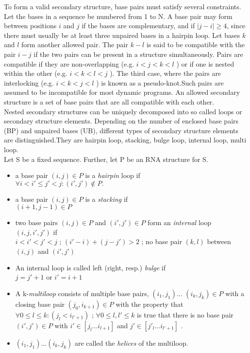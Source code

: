 \documentclass[twoside,a4paper]{report}
\begin{document}
	To form a valid secondary structure, base pairs must satisfy several constraints. Let the bases in a sequence be numbered from 1 to N. A base pair may form between positions $i$ and $j$ if the bases are complementary, and if $|j - i | \geq 4$, since there must usually be at least three unpaired bases in a hairpin loop. Let bases $k$ and $l$ form another allowed pair. The pair $k - l$ is said to be compatible with the pair $i - j$ if the two pairs can be present in a structure simultaneously. Pairs are compatible if they are non-overlapping (e.g. $i<j<k<l$ ) or if one is nested within the other (e.g. $i<k<l<j$ ). The third case, where the pairs are interlocking (e.g. $i<k<j<l$ ) is known as a pseudo-knot.Such pairs are assumed to be incompatible for
	most dynamic programs. An allowed secondary structure is a set of base pairs that are all compatible with each other.\\
	Nested secondary structures can be uniquely decomposed into so called loops or secondary structure elements. Depending on the number of enclosed base pairs (BP) and unpaired bases (UB), different types of secondary structure elements are distinguished.They are hairpin loop, stacking, bulge loop, internal loop, multi loop. \\
	Let S be a fixed sequence. Further, let P be an RNA structure for S.
	\begin{itemize}
		\item a base pair $( i, j ) \in P$ is a \textit{hairpin} loop if\\
			$	\forall i < i' \leq j' < j : (i', j') \notin P. $

		\item a base pair $( i, j ) \in P$ is a \textit{stacking} if\\
		$(i + 1 , j - 1 ) \in P $
		\item two base pairs $ (i, j) \in P$ and $(i' ,j' ) \in P$ form  an \textit{internal} loop $(i,j,i',j')$ if \\
		$i < i' < j' < j $ ; $ (i' - i)+( j - j') > 2$ ; no base pair $(k,l)$ between $(i, j)$ and $(i',j')$
		\item An internal loop is called left (right, resp.) \textit{bulge} if\\
		$ j = j' +1 $ or $ i' = i+1$
		\item A k-\textit{multiloop} consists of multiple base pairs, $(i_1,j_1)$... $(i_k,j_k) \in P$ with a closing base pair $(j_0, i_{k+1}) \in P$ with the property that \\
		$\forall 0 \leq l \leq k : ( j_l < i_{l'+1})$ ; $\forall 0 \leq l , l' \leq k$ is true that there is no base pair $(i' ,j') \in P$ with $i' \in [j_l...i_{l+1}]$ and $j' \in [j'_l...i_{l'+1}]$ .
		\item $(i_1,j_1)...(i_k, j_k)$ are called the \textit{helices} of the multiloop. 
 	\end{itemize}
\end{document}
